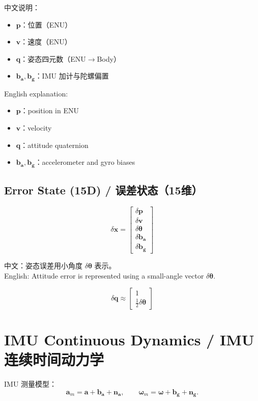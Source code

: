 \documentclass[12pt,a4paper]{ctexart} %
\begin{document}
中文说明：  
\begin{itemize}
  \item \(\mathbf{p}\)：位置（ENU）
  \item \(\mathbf{v}\)：速度（ENU）
  \item \(\mathbf{q}\)：姿态四元数（ENU$\rightarrow$Body）
  \item \(\mathbf{b_a}, \mathbf{b_g}\)：IMU 加计与陀螺偏置
\end{itemize}

English explanation:  
\begin{itemize}
  \item \(\mathbf{p}\)：position in ENU
  \item \(\mathbf{v}\)：velocity
  \item \(\mathbf{q}\)：attitude quaternion
  \item \(\mathbf{b_a}, \mathbf{b_g}\)：accelerometer and gyro biases
\end{itemize}

\subsection{Error State (15D) / 误差状态（15维）}

\[
\delta \mathbf{x} =
\begin{bmatrix}
\delta\mathbf{p} \\
\delta\mathbf{v} \\
\delta \boldsymbol{\theta} \\
\delta\mathbf{b_a} \\
\delta\mathbf{b_g}
\end{bmatrix}
\]

中文：姿态误差用小角度 \(\delta\boldsymbol{\theta}\) 表示。\\
English: Attitude error is represented using a small-angle vector \(\delta\boldsymbol{\theta}\).

\[
\delta\mathbf{q} \approx 
\begin{bmatrix}1 \\ \frac{1}{2}\delta\boldsymbol{\theta}\end{bmatrix}
\]

\section{IMU Continuous Dynamics / IMU 连续时间动力学}

IMU 测量模型：
\[
\mathbf{a}_m = \mathbf{a} + \mathbf{b_a} + \mathbf{n_a},\qquad
\boldsymbol{\omega}_m = \boldsymbol{\omega} + \mathbf{b_g} + \mathbf{n_g}.
\]
\end{document}
